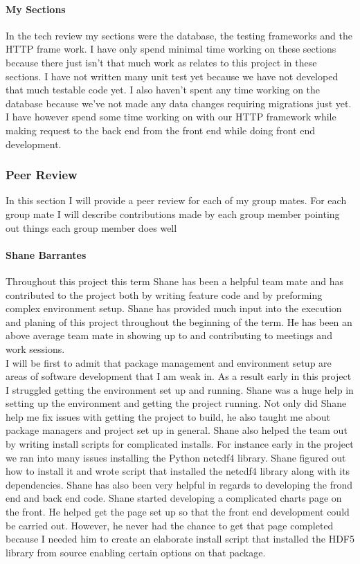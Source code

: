 \documentclass[onecolumn, draftclsnofoot,10pt, compsoc]{article}
\begin{document}
		\paragraph{My Sections} \hfill \break
		In the tech review my sections were the database, the testing frameworks and the HTTP frame work. I have only spend minimal time working on these sections because there just isn't that much work as relates to this project in these sections. I have not written many unit test yet because we have not developed that much testable code yet. I also haven’t spent any time working on the database because we've not made any data changes requiring migrations just yet. I have however spend some time working on with our HTTP framework while making request to the back end from the front end while doing front end development.\\

	\subsubsection{Peer Review}
		In this section I will provide a peer review for each of my group mates. For each group mate I will describe contributions made by each group member pointing out things each group member does well
		\paragraph{Shane Barrantes} \hfill \break
			Throughout this project this term Shane has been a helpful team mate and has contributed to the project both by writing feature code and by preforming complex environment setup. Shane has provided much input into the execution and planing of this project throughout the beginning of the term. He has been an above average team mate in showing up to and contributing to meetings and work sessions.\\

			I will be first to admit that package management and environment setup are areas of software development that I am weak in. As a result early in this project I struggled getting the environment set up and running. Shane was a huge help in setting up the environment and getting the project running. Not only did Shane help me fix issues with getting the project to build, he also taught me about package managers and project set up in general. Shane also helped the team out by writing install scripts for complicated installs. For instance early in the project we ran into many issues installing the Python netcdf4 library. Shane figured out how to install it and wrote script that installed the netcdf4 library along with its dependencies. Shane has also been very helpful in regards to developing the frond end and back end code. Shane started developing a complicated charts page on the front. He helped get the page set up so that the front end development could be carried out. However, he never had the chance to get that page completed because I needed him to create an elaborate install script that installed the HDF5 library from source enabling certain options on that package.\\
\end{document}
